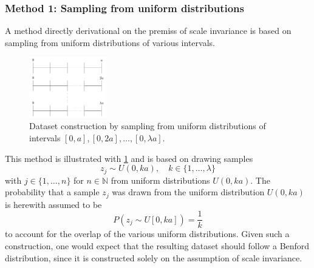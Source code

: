 \documentclass[a4paper,11pt, twocolumn]{article}
\begin{document}
\subsubsection{Method 1: Sampling from uniform distributions}
A method directly derivational on the premiss of scale invariance is based on sampling from uniform distributions of various intervals.
\begin{figure}[h]
	\centering
	\includegraphics[width=0.3\textwidth]{figures/uniformscale.pdf}
	\caption{Dataset construction by sampling from uniform distributions of intervals $[0,a], [0,2a], \dots, [0,\lambda a]$.}
	\label{fig:uniformscale}
\end{figure}
This method is illustrated with \cref{fig:uniformscale} and is based on drawing samples 
\begin{equation}
	z_{j} \sim U(0,ka), \quad k \in \{1,\dots,\lambda\}
\end{equation}
with $j \in \{1,\dots,n\}$ for $n \in \mathbb{N}$ from uniform distributions $U(0,ka)$. The probability that a sample $z_j$ was drawn from the uniform distribution $U(0,ka)$ is herewith assumed to be \begin{equation}
	P(z_j \sim U[0,ka]) = \frac{1}{k}
\end{equation} to account for the overlap of the various uniform distributions. Given such a construction, one would expect that the resulting dataset should follow a Benford distribution, since it is constructed solely on the assumption of scale invariance.

\end{document}
